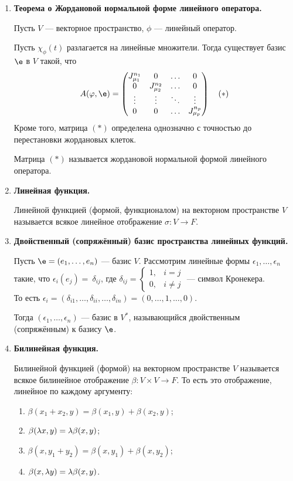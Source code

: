 \begin{enumerate}
\item \textbf{Теорема о Жордановой нормальной форме линейного оператора.}

Пусть $V$ --- векторное пространство, $\phi$ --- линейный оператор.

Пусть $\chi_\phi(t)$ разлагается на линейные множители. Тогда существует базис $\e$ в $V$ такой, что 
\begin{gather*}
A(\phi, \e) = 
\begin{pmatrix*}
J_{\mu_1}^{n_1} & 0 & \ldots & 0 \\
0 & J_{\mu_2}^{n_2} & \ldots & 0 \\
\vdots & \vdots & \ddots & \vdots \\
0 & 0 & \ldots & J_{\mu_p}^{n_p}
\end{pmatrix*} \quad (*)
\end{gather*}
Кроме того, матрица $(*)$ определена однозначно с точностью до перестановки жордановых клеток.

Матрица $(*)$ называется жордановой нормальной формой линейного оператора.

\item \textbf{Линейная функция.}

Линейной функцией (формой, функционалом) на векторном пространстве $V$ называется всякое линейное отображение $\sigma \colon V \rightarrow F$.

\item \textbf{Двойственный (сопряжённый) базис пространства линейных функций.} 

Пусть $\e = (e_1, \ldots, e_n)$ --- базис $V$. Рассмотрим линейные формы $\epsilon_1, \ldots, \epsilon_n$ такие, что $\epsilon_i(e_j) =~\delta_{ij}$, где $\delta_{ij} =
\begin{cases}
1, & i = j \\
0, & i \neq j
\end{cases}
$ --- символ Кронекера. \\То есть $\epsilon_i = (\delta_{i1}, \ldots, \delta_{ii}, \ldots, \delta_{in}) = (0, \ldots, 1, \ldots, 0)$.

Тогда $(\epsilon_1, \ldots, \epsilon_n)$ --- базис в $V^*$, называющийся двойственным (сопряжённым) к базису $\e$.
\item \textbf{Билинейная функция.}

Билинейной функцией (формой) на векторном пространстве $V$ называется всякое билинейное отображение $\beta \colon V \times V \rightarrow F$. То есть это отображение, линейное по каждому аргументу:
\begin{enumerate}
\item $\beta(x_1 + x_2, y) = \beta(x_1, y) + \beta(x_2, y)$; 
\item $\beta(\lambda x, y) = \lambda\beta(x, y)$;
\item $\beta(x, y_1 + y_2) = \beta(x, y_1) + \beta(x, y_2)$;
\item $\beta(x, \lambda y) = \lambda\beta(x, y)$.
\end{enumerate}


\end{enumerate}
